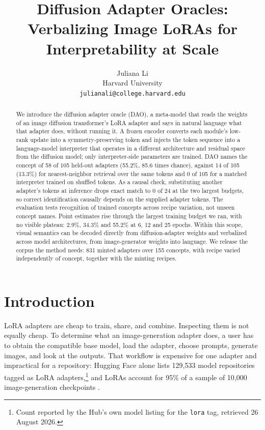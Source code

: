 \documentclass{article}
\title{Diffusion Adapter Oracles:\\ Verbalizing Image LoRAs for Interpretability at Scale}
\author{Juliana Li\\
  Harvard University\\
  \texttt{julianali@college.harvard.edu}
}
\begin{document}
\maketitle

\begin{abstract}
We introduce the diffusion adapter oracle (DAO), a meta-model that reads the weights of an image
diffusion transformer's LoRA adapter and says in natural language what that adapter does, without
running it. A frozen encoder converts each module's low-rank update into a symmetry-preserving
token and injects the token sequence into a language-model interpreter that operates in a different
architecture and residual space from the diffusion model; only interpreter-side parameters are
trained. DAO names the concept of 58 of 105 held-out adapters (55.2\%, 85.6 times chance), against
14 of 105 (13.3\%) for nearest-neighbor retrieval over the same tokens and 0 of 105 for a matched
interpreter trained on shuffled tokens. As a causal check, substituting another adapter's tokens at
inference drops exact match to 0 of 24 at the two largest budgets, so correct identification
causally depends on the supplied adapter tokens. The evaluation tests recognition of trained
concepts across recipe variation, not unseen concept names.
Point estimates rise through the largest training budget we ran, with no visible plateau:
2.9\%, 34.3\% and 55.2\% at 6, 12 and 25 epochs. Within
this scope, visual semantics can be decoded directly from diffusion-adapter weights and verbalized
across model architectures, from image-generator weights into language. We release the corpus the method needs: 831 minted adapters over 155 concepts, with recipe varied
independently of concept, together with the minting recipes.
\end{abstract}

\section{Introduction}

LoRA adapters \citep{hu2022lora} are cheap to train, share, and combine. Inspecting them is not
equally cheap. To determine what an image-generation adapter does, a user has to obtain the
compatible base model, load the adapter, choose prompts, generate images, and look at the outputs.
That workflow is expensive for one adapter and impractical for a repository: Hugging Face alone
lists 129{,}533 model repositories tagged as LoRA adapters,\footnote{Count reported by the Hub's own
model listing for the \texttt{lora} tag, retrieved 26 August 2026.} and LoRAs account for 95\% of a
sample of 10{,}000 image-generation checkpoints \citep{bossan2026beyondlora}.
\end{document}
